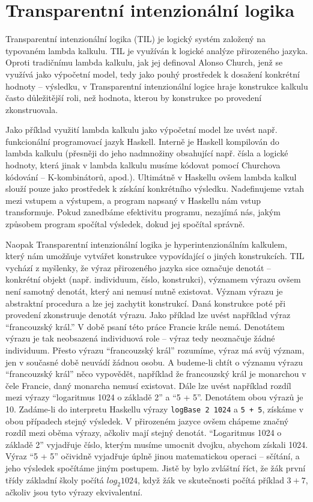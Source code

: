 \chapter{Transparentní intenzionální logika}
\label{sec:TILIntroduction}

Transparentní intenzionální logika (TIL) je logický systém založený na typovaném lambda kalkulu.
TIL je využíván k logické analýze přirozeného jazyka. Oproti tradičnímu lambda kalkulu, jak jej
definoval Alonso Church\cite{lambda-calculus}, jenž
se využívá jako výpočetní model, tedy jako pouhý prostředek k dosažení konkrétní hodnoty --
výsledku, v Transparentní intenzionální logice hraje konstrukce kalkulu často důležitější roli,
než hodnota, kterou by konstrukce po provedení zkonstruovala\cite{til-duzi}.

Jako příklad využití lambda kalkulu jako výpočetní model lze uvést např. funkcionální programovací
jazyk Haskell. Interně je Haskell kompilován do lambda kalkulu (přesněji do jeho nadmnožiny
obsahující např. čísla a logické hodnoty, která jinak v lambda kalkulu musíme kódovat pomocí
Churchova kódování -- K-kombinátorů\cite{lambda-calculus}, apod.).
Ultimátně v Haskellu ovšem lambda kalkul slouží pouze jako prostředek k získání konkrétního
výsledku. Nadefinujeme vztah mezi vstupem a výstupem, a program napsaný v Haskellu nám vstup
transformuje. Pokud zanedbáme efektivitu programu, nezajímá nás, jakým způsobem program spočítal
výsledek, dokud jej spočítal správně.

\lstset{language=Haskell}

Naopak Transparentní intenzionální logika je hyperintenzionálním kalkulem, který nám umožňuje
vytvářet konstrukce vypovídající o jiných konstrukcích. TIL vychází z myšlenky, že výraz
přirozeného jazyka sice označuje denotát -- konkrétní objekt (např. individuum, číslo, konstrukci),
významem výrazu ovšem není samotný denotát, který ani nemusí nutně existovat. Význam výrazu je
abstraktní procedura a lze jej zachytit konstrukcí. Daná konstrukce poté při provedení zkonstruuje
denotát výrazu. Jako příklad lze uvést například výraz ``francouzský král.'' V době psaní této práce
Francie krále nemá. Denotátem výrazu je tak neobsazená individuová role -- výraz tedy neoznačuje
žádné individuum. Přesto výrazu ``francouzský král'' rozumíme, výraz má svůj význam, jen v současné
době neuvádí žádnou osobu. A budeme-li chtít o významu výrazu ``francouzský král'' něco vypovědět,
například že francouzský král je monarchou v čele Francie, daný monarcha nemusí existovat. Dále lze
uvést například rozdíl mezi výrazy ``logaritmus 1024 o základě 2'' a ``5 + 5''. Denotátem obou
výrazů je 10. Zadáme-li do interpretu Haskellu výrazy
\lstinline{logBase 2 1024} a \lstinline{5 + 5}, získáme v obou případech stejný výsledek.
V přirozeném jazyce ovšem chápeme značný rozdíl mezi oběma výrazy, ačkoliv mají stejný denotát.
``Logaritmus 1024 o základě 2'' vyjadřuje číslo, kterým musíme umocnit dvojku, abychom získali 1024.
Výraz ``5 + 5'' očividně vyjadřuje úplně jinou matematickou operaci -- sčítání, a jeho výsledek
spočítáme jiným postupem. Jistě by bylo zvláštní říct, že žák první třídy základní školy počítá
$log_{2} 1024$, když žák ve skutečnosti počítá příklad $3 + 7$, ačkoliv jsou tyto výrazy
ekvivalentní.

